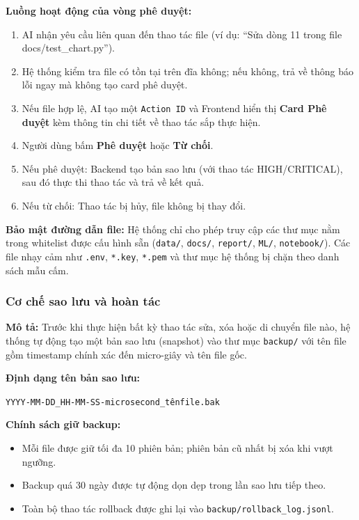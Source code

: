 \noindent\textbf{Luồng hoạt động của vòng phê duyệt:}
\begin{enumerate}
    \item AI nhận yêu cầu liên quan đến thao tác file (ví dụ: ``Sửa dòng 11 trong file docs/test\_\allowbreak chart.py'').
    \item Hệ thống kiểm tra file có tồn tại trên đĩa không; nếu không, trả về thông báo lỗi ngay mà không tạo card phê duyệt.
    \item Nếu file hợp lệ, AI tạo một \texttt{Action ID} và Frontend hiển thị \textbf{Card Phê duyệt} kèm thông tin chi tiết về thao tác sắp thực hiện.
    \item Người dùng bấm \textbf{Phê duyệt} hoặc \textbf{Từ chối}.
    \item Nếu phê duyệt: Backend tạo bản sao lưu (với thao tác HIGH/CRITICAL), sau đó thực thi thao tác và trả về kết quả.
    \item Nếu từ chối: Thao tác bị hủy, file không bị thay đổi.
\end{enumerate}

\noindent\textbf{Bảo mật đường dẫn file:}
Hệ thống chỉ cho phép truy cập các thư mục nằm trong whitelist được cấu hình sẵn (\texttt{data/}, \texttt{docs/}, \texttt{report/}, \texttt{ML/}, \texttt{notebook/}). Các file nhạy cảm như \texttt{.env}, \texttt{*.key}, \texttt{*.pem} và thư mục hệ thống bị chặn theo danh sách mẫu cấm.

\subsubsection{Cơ chế sao lưu và hoàn tác}
\label{subsubsec:backup_rollback}

\noindent\textbf{Mô tả:}
Trước khi thực hiện bất kỳ thao tác sửa, xóa hoặc di chuyển file nào, hệ thống tự động tạo một bản sao lưu (snapshot) vào thư mục \texttt{backup/} với tên file gồm timestamp chính xác đến micro-giây và tên file gốc.

\noindent\textbf{Định dạng tên bản sao lưu:}
\begin{center}
\texttt{YYYY-MM-DD\_HH-MM-SS-microsecond\_tênfile.bak}
\end{center}

\noindent\textbf{Chính sách giữ backup:}
\begin{itemize}
    \item Mỗi file được giữ tối đa 10 phiên bản; phiên bản cũ nhất bị xóa khi vượt ngưỡng.
    \item Backup quá 30 ngày được tự động dọn dẹp trong lần sao lưu tiếp theo.
    \item Toàn bộ thao tác rollback được ghi lại vào \texttt{backup/rollback\_log.jsonl}.
\end{itemize}

